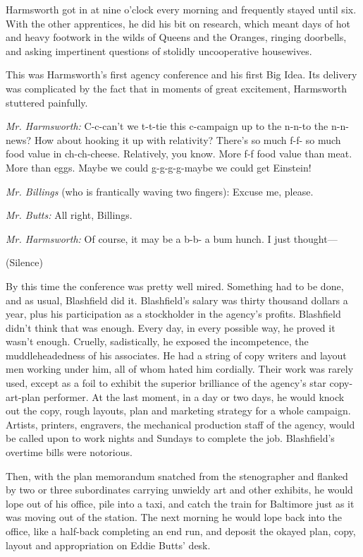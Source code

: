 \documentclass[openany,nobib]{tufte-book}
\begin{document}
Harmsworth got in at nine o'clock every morning and frequently stayed
until six. With the other apprentices, he did his bit on research, which
meant days of hot and heavy footwork in the wilds of Queens and the
Oranges, ringing doorbells, and asking impertinent questions of stolidly
uncooperative housewives.

This was Harmsworth's first agency conference and his first Big Idea.
Its delivery was complicated by the fact that in moments of great
excitement, Harmsworth stuttered painfully.

\emph{Mr. Harmsworth:} C-c-can't we t-t-tie this c-campaign up to the
n-n-to the n-n-news? How about hooking it up with relativity? There's so
much f-f- so much food value in ch-ch-cheese. Relatively, you know. More
f-f food value than meat. More than eggs. Maybe we could g-g-g-g-maybe
we could get Einstein!

\emph{Mr. Billings} (who is frantically waving two fingers): Excuse me,
please.

\emph{Mr. Butts:} All right, Billings.

\emph{Mr. Harmsworth:} Of course, it may be a b-b- a bum hunch. I just
thought---

(Silence)

By this time the conference was pretty well mired. Something had to be
done, and as usual, Blashfield did it. Blashfield's salary was thirty
thousand dollars a year, plus his participation as a stockholder in the
agency's profits. Blashfield didn't think that was enough. Every day, in
every possible way, he proved it wasn't enough. Cruelly, sadistically,
he exposed the incompetence, the muddleheadedness of his associates. He
had a string of copy writers and layout men working under him, all of
whom hated him cordially. Their work was rarely used, except as a foil
to exhibit the superior brilliance of the agency's star copy-art-plan
performer. At the last moment, in a day or two days, he would knock out
the copy, rough layouts, plan and marketing strategy for a whole
campaign. Artists, printers, engravers, the mechanical production staff
of the agency, would be called upon to work nights and Sundays to
complete the job. Blashfield's overtime bills were notorious.

Then, with the plan memorandum snatched from the stenographer and
flanked by two or three subordinates carrying unwieldy art and other
exhibits, he would lope out of his office, pile into a taxi, and catch
the train for Baltimore just as it was moving out of the station. The
next morning he would lope back into the office, like a half-back
completing an end run, and deposit the okayed plan, copy, layout and
appropriation on Eddie Butts' desk.
\end{document}
